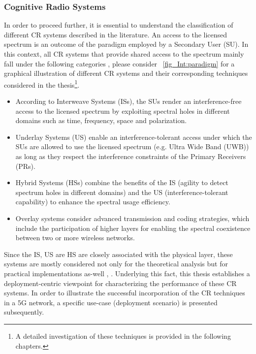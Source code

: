 \subsubsection*{Cognitive Radio Systems}


In order to proceed further, it is essential to understand the classification of different CR systems described in the literature. An access to the licensed spectrum is an outcome of the paradigm employed by a Secondary User (SU). In this context, all CR systems that provide shared access to the spectrum mainly fall under the following categories \cite{Goldsmith09}, please consider \figurename~\ref{fig_Int:paradigm} for a graphical illustration of different CR systems and their corresponding techniques considered in the thesis\footnote{A detailed investigation of these techniques is provided in the following chapters.}. 
\begin{itemize}
\item According to Interweave Systems (ISs), the SUs render an interference-free access to the licensed spectrum by exploiting spectral holes in different domains such as time, frequency, space and polarization. 
\item Underlay Systems (US) enable an interference-tolerant access under which the SUs are allowed to use the licensed spectrum (e.g. Ultra Wide Band (UWB)) as long as they respect the interference constraints of the Primary Receivers (PRs). 
\item Hybrid Systems (HSs) combine the benefits of the IS (agility to detect spectrum holes in different domains) and the US (interference-tolerant capability) to enhance the spectral usage efficiency.  
\item Overlay systems consider advanced transmission and coding strategies, which include the participation of higher layers for enabling the spectral coexistence between two or more wireless networks. 
\end{itemize}
Since the IS, US are HS are closely associated with the physical layer, these systems are mostly considered not only for the theoretical analysis but for practical implementations as-well , \cite{Cabric04, Cabric06, Kim10}. 
Underlying this fact, this thesis establishes a deployment-centric viewpoint for characterizing the performance of these CR systems. In order to illustrate the successful incorporation of the CR techniques in a 5G network, a specific use-case (deployment scenario) is presented subsequently. 


